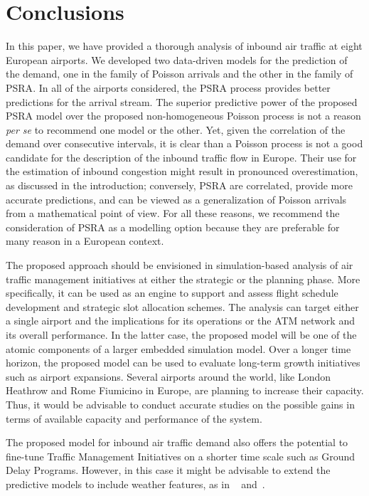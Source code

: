\documentclass[draft,review]{elsarticle}
\begin{document}
\section{Conclusions}\label{sec:conclusions}

 
  In this paper, we have provided a thorough analysis of inbound air traffic at eight European airports. We developed two data-driven models for the prediction of the demand, one in the family of Poisson arrivals and the other in the family of \ac{PSRA}.
  In all of the  airports considered, the \ac{PSRA} process provides better predictions for the arrival stream.
  The superior predictive power of the proposed \ac{PSRA} model over the proposed non-homogeneous Poisson process is not a reason \emph{per se} to recommend one model or the other.
  Yet, given the correlation of the demand over consecutive intervals, it is clear than a Poisson process is not a good candidate for the description of the inbound traffic flow in Europe. Their use for the estimation of inbound congestion might result in pronounced overestimation, as discussed in the introduction; conversely, \ac{PSRA} are correlated, provide more accurate predictions, and can be viewed as a generalization of Poisson arrivals from a mathematical point of view. For all these reasons, we recommend the  consideration of \ac{PSRA} as a modelling option because they are preferable for many reason in a European context.

  The proposed approach should be envisioned in simulation-based analysis of air traffic management initiatives at either the strategic or the planning phase.
  More specifically, it can be used as an engine to support and assess flight schedule development and strategic slot allocation schemes.
  The analysis can target either a single airport and the implications for its operations or the ATM network and its overall performance.
  In the latter case, the proposed model will be one of the atomic components of a larger embedded simulation model.
  Over a longer time horizon, the proposed model can be used to evaluate long-term growth initiatives such as airport expansions.
  Several airports around the world, like London Heathrow and Rome Fiumicino in Europe, are planning to increase their capacity.
  Thus, it would be advisable to conduct accurate studies on the possible gains in terms of available capacity and performance of the system.

  The proposed model for inbound air traffic demand also offers the potential  to fine-tune Traffic Management Initiatives on a shorter time scale such as Ground Delay Programs.
  However, in this case it might be advisable to extend the predictive models to include weather features, as in ~\cite{liu2017} and~\cite{gopal2017}.
\end{document}

